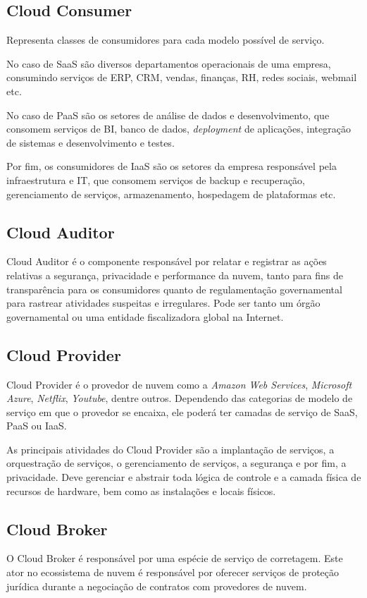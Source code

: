 	\subsection{Cloud Consumer}
	Representa classes de consumidores para cada modelo possível de serviço. 

	No caso de SaaS são diversos departamentos operacionais de uma empresa, consumindo serviços de ERP, CRM, vendas, finanças, RH, redes sociais, webmail etc. 

	No caso de PaaS são os setores de análise de dados e desenvolvimento, que consomem serviços de BI, banco de dados, \textit{deployment} de aplicações, integração de sistemas e desenvolvimento e testes.

	Por fim, os consumidores de IaaS são os setores da empresa responsável pela infraestrutura e IT, que consomem serviços de backup e recuperação, gerenciamento de serviços, armazenamento, hospedagem de plataformas etc.

	\subsection{Cloud Auditor}
	Cloud Auditor é o componente responsável por relatar e registrar as ações relativas a segurança, privacidade e performance da nuvem, tanto para fins de transparência para os consumidores quanto de regulamentação governamental para rastrear atividades suspeitas e irregulares. Pode ser tanto um órgão governamental ou uma entidade fiscalizadora global na Internet.

	\subsection{Cloud Provider}
	Cloud Provider é o provedor de nuvem como a \textit{Amazon Web Services}, \textit{Microsoft Azure}, \textit{Netflix}, \textit{Youtube}, dentre outros. Dependendo das categorias de modelo de serviço em que o provedor se encaixa, ele poderá ter camadas de serviço de SaaS, PaaS ou IaaS. 

	As principais atividades do Cloud Provider são a implantação de serviços, a orquestração de serviços, o gerenciamento de serviços, a segurança e por fim, a privacidade. Deve gerenciar e abstrair toda lógica de controle e a camada física de recursos de hardware, bem como as instalações e locais físicos.

	\subsection{Cloud Broker}
	O Cloud Broker é responsável por uma espécie de serviço de corretagem. Este ator no ecossistema de nuvem é responsável por oferecer serviços de proteção jurídica durante a negociação de contratos com provedores de nuvem. 


